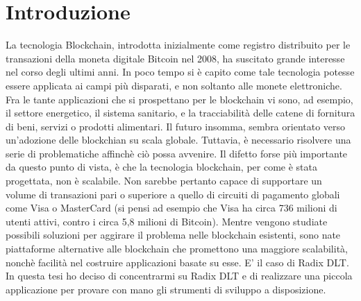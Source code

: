 \chapter*{Introduzione}                 %

La tecnologia Blockchain, introdotta inizialmente come registro distribuito per le transazioni della moneta digitale Bitcoin nel 2008, ha suscitato grande interesse nel corso degli ultimi anni. In poco tempo si è capito come tale tecnologia potesse essere applicata ai campi più disparati, e non soltanto alle monete elettroniche. Fra le tante applicazioni che si prospettano per le blockchain vi sono, ad esempio, il settore energetico, il sistema sanitario, e la tracciabilità delle catene di fornitura di beni, servizi o prodotti alimentari. Il futuro insomma, sembra orientato verso un'adozione delle blockchian su scala globale. Tuttavia, è necessario risolvere una serie di problematiche affinchè ciò possa avvenire. Il difetto forse più importante da questo punto di vista, è che la tecnologia blockchain, per come è stata progettata, non è scalabile. Non sarebbe pertanto capace di supportare un volume di transazioni pari o superiore a quello di circuiti di pagamento globali come Visa o MasterCard (si pensi ad esempio che Visa ha circa 736 milioni di utenti attivi, contro i circa 5,8 milioni di Bitcoin). Mentre vengono studiate possibili soluzioni per aggirare il problema nelle blockchain esistenti, sono nate piattaforme alternative alle blockchain che promettono una maggiore scalabilità, nonchè facilità nel costruire applicazioni basate su esse. E' il caso di Radix DLT. In questa tesi ho deciso di concentrarmi su Radix DLT e di realizzare una piccola applicazione per provare con mano gli strumenti di sviluppo a disposizione. 

